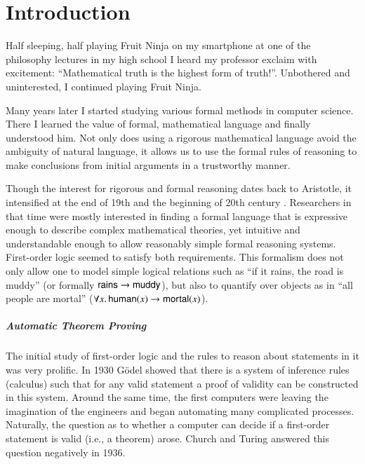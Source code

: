 \chapter{Introduction}
\label{ch:intro}

Half sleeping, half playing Fruit Ninja on my smartphone at one of the
philosophy lectures in my high school I heard my professor exclaim with
excitement: “Mathematical truth is the highest form of truth!”.
Unbothered and uninterested, I continued playing Fruit Ninja.

Many years later I started studying various formal methods in computer science.
There I learned the value of formal, mathematical language and finally
understood him. Not only does using a rigorous mathematical language avoid the
ambiguity of natural language, it allows us to use the formal rules of reasoning
to make conclusions from initial arguments in a trustworthy manner. 

Though the interest for rigorous and formal reasoning dates back to Aristotle,
it intensified at the end of 19th and the beginning of 20th century
\cite{jf-01-modern-logic}. Researchers in that time were mostly interested in
finding a formal language that is expressive enough to describe complex
mathematical theories, yet intuitive and understandable enough to allow
reasonably simple formal reasoning systems. First-order logic seemed to satisfy
both requirements.  This formalism does not only allow one to model simple
logical relations such as ``if it rains, the road is muddy'' (or formally
$\mathsf{rains} \rightarrow \mathsf{muddy}$), but also to quantify over objects as in ``all
people are mortal'' ($\forall x.\, \mathsf{human}(x) \rightarrow \mathsf{mortal}(x)$).

\paragraph{Automatic Theorem Proving}The initial study of first-order logic and the rules to reason about statements in
it was very prolific. In 1930 G\"odel \cite{kg-30-completeness-theorem} showed
that there is a system of inference rules (calculus) such that for any valid
statement a proof of validity can be constructed in this system. Around the same
time, the first computers were leaving the imagination of the engineers and
began automating many complicated processes.  Naturally, the question as to
whether a computer can decide if a first-order statement is valid (i.e., a
theorem) arose. Church \cite{ac-36-fol-undecidable} and Turing
\cite{tm-37-undecidable} answered this question negatively in 1936.

